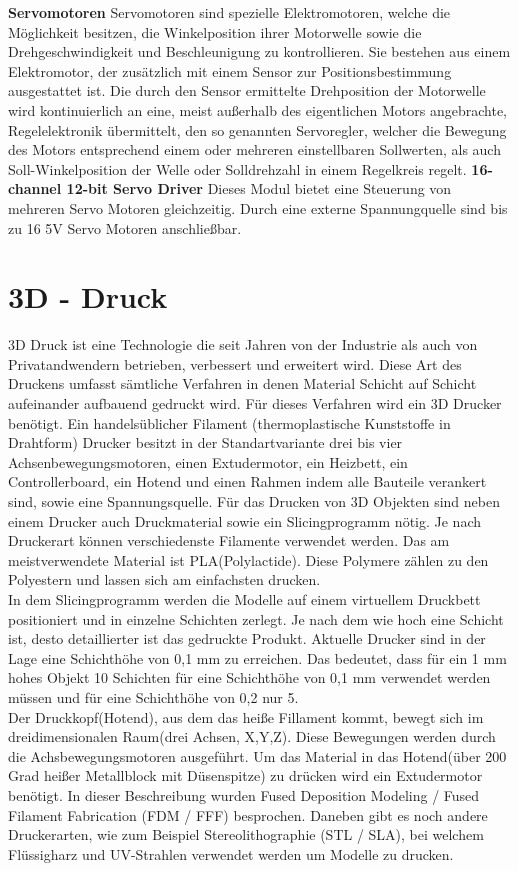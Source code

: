 \documentclass[12pt,					%
							 oneside,			%
							 a4paper,			%
							 halfparskip,		%
							 liststotoc,			%
							 bibtotoc,			%
							 fleqn,				%
							 pointlessnumbers]	%
							 {scrreprt}
\begin{document}
\textbf{Servomotoren}\newline
	Servomotoren sind spezielle Elektromotoren, welche die Möglichkeit besitzen, die Winkelposition ihrer Motorwelle sowie die Drehgeschwindigkeit und Beschleunigung zu kontrollieren. Sie bestehen aus einem Elektromotor, der zusätzlich mit einem Sensor zur Positionsbestimmung ausgestattet ist.  Die durch den Sensor ermittelte Drehposition der Motorwelle wird kontinuierlich an eine, meist außerhalb des eigentlichen Motors angebrachte, Regelelektronik übermittelt, den so genannten Servoregler, welcher die Bewegung des Motors entsprechend einem oder mehreren einstellbaren Sollwerten, als auch Soll-Winkelposition der Welle oder Solldrehzahl in einem Regelkreis regelt.	
	\newline\newline	
\textbf{16-channel 12-bit Servo Driver}\newline
	Dieses Modul bietet eine Steuerung von mehreren Servo Motoren gleichzeitig. Durch eine externe Spannungquelle sind bis zu 16 5V Servo Motoren anschließbar.

\section{3D - Druck}
3D Druck ist eine Technologie die seit Jahren von der Industrie als auch von Privatandwendern betrieben, verbessert und erweitert wird. Diese Art des Druckens umfasst sämtliche Verfahren in denen Material Schicht auf Schicht aufeinander aufbauend gedruckt wird.
Für dieses Verfahren wird ein 3D Drucker benötigt. Ein handelsüblicher Filament (thermoplastische Kunststoffe in Drahtform) Drucker besitzt in der Standartvariante drei bis vier Achsenbewegungsmotoren, einen Extudermotor, ein Heizbett, ein Controllerboard, ein Hotend und einen Rahmen indem alle Bauteile verankert sind, sowie eine Spannungsquelle.
Für das Drucken von 3D Objekten sind neben einem Drucker auch Druckmaterial sowie ein Slicingprogramm nötig. Je nach Druckerart können verschiedenste Filamente verwendet werden. Das am meistverwendete Material ist PLA(Polylactide). Diese Polymere zählen zu den Polyestern und lassen sich am einfachsten drucken. \\
In dem Slicingprogramm werden die Modelle auf einem virtuellem Druckbett positioniert und in einzelne Schichten zerlegt. Je nach dem wie hoch eine Schicht ist, desto detaillierter ist das gedruckte Produkt. Aktuelle Drucker sind in der Lage eine Schichthöhe von 0,1 mm zu erreichen. Das bedeutet, dass für ein 1 mm hohes Objekt 10 Schichten für eine Schichthöhe von 0,1 mm verwendet werden müssen und für eine Schichthöhe von 0,2 nur 5. \\
Der Druckkopf(Hotend), aus dem das heiße Fillament kommt, bewegt sich im dreidimensionalen Raum(drei Achsen, X,Y,Z). Diese Bewegungen werden durch die Achsbewegungsmotoren ausgeführt. Um das Material in das Hotend(über 200 Grad heißer Metallblock mit Düsenspitze) zu drücken wird ein Extudermotor benötigt.
In dieser Beschreibung wurden Fused Deposition Modeling / Fused Filament Fabrication (FDM / FFF) besprochen. Daneben gibt es noch andere Druckerarten, wie zum Beispiel Stereolithographie (STL / SLA), bei welchem Flüssigharz und UV-Strahlen verwendet werden um Modelle zu drucken.
\end{document}
